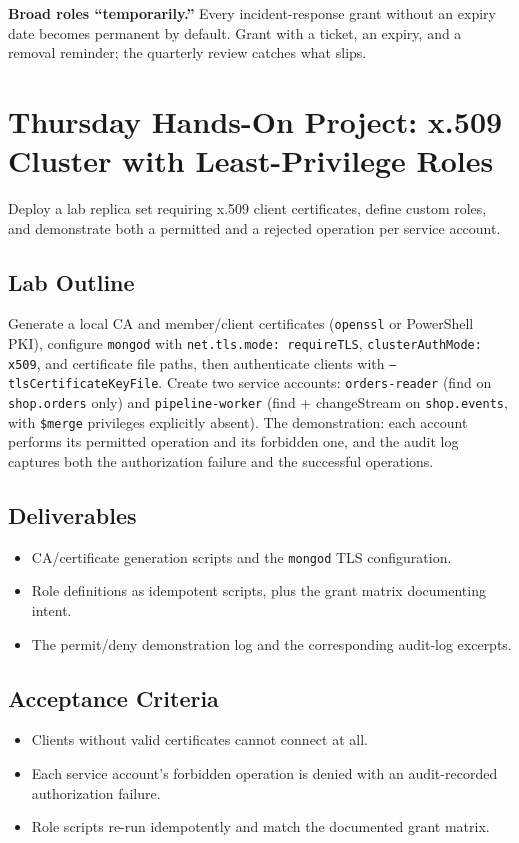 \begin{pitfall}
\textbf{Broad roles ``temporarily.''} Every incident-response grant without an expiry date becomes permanent by default. Grant with a ticket, an expiry, and a removal reminder; the quarterly review catches what slips.
\end{pitfall}

\section{Thursday Hands-On Project: x.509 Cluster with Least-Privilege Roles}
Deploy a lab replica set requiring x.509 client certificates, define custom roles, and demonstrate both a permitted and a rejected operation per service account.

\subsection{Lab Outline}
Generate a local CA and member/client certificates (\texttt{openssl} or PowerShell PKI), configure \texttt{mongod} with \texttt{net.tls.mode: requireTLS}, \texttt{clusterAuthMode: x509}, and certificate file paths, then authenticate clients with \texttt{--tlsCertificateKeyFile}. Create two service accounts: \texttt{orders-reader} (find on \texttt{shop.orders} only) and \texttt{pipeline-worker} (find + changeStream on \texttt{shop.events}, with \texttt{\$merge} privileges explicitly absent). The demonstration: each account performs its permitted operation and its forbidden one, and the audit log captures both the authorization failure and the successful operations.

\subsection*{Deliverables}
\begin{itemize}
    \item CA/certificate generation scripts and the \texttt{mongod} TLS configuration.
    \item Role definitions as idempotent scripts, plus the grant matrix documenting intent.
    \item The permit/deny demonstration log and the corresponding audit-log excerpts.
\end{itemize}

\subsection*{Acceptance Criteria}
\begin{itemize}
    \item Clients without valid certificates cannot connect at all.
    \item Each service account's forbidden operation is denied with an audit-recorded authorization failure.
    \item Role scripts re-run idempotently and match the documented grant matrix.
\end{itemize}

